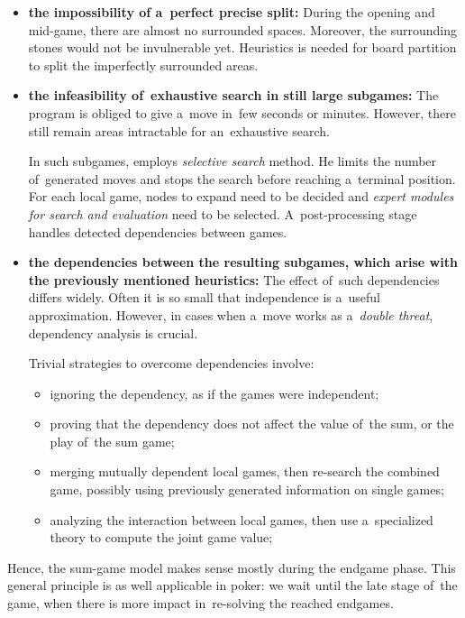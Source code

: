 \begin{itemize}[-]
  \item \textbf{the impossibility of a~perfect precise split:}
    During the opening and mid-game, there are almost no surrounded spaces.
    Moreover, the surrounding stones would not be invulnerable yet.
    Heuristics is needed for board partition to split the imperfectly surrounded areas.

  \item \textbf{the infeasibility of~exhaustive search in still large subgames:}
    The program is obliged to give a~move in~few seconds or minutes.
    However, there still remain areas intractable for an~exhaustive search.

    In such subgames, \Mueller{} employs \emph{selective search} method.
    He limits the number of~generated moves and stops the search before reaching a~terminal position.
    For each local game, nodes to expand need to be decided and \emph{expert modules for search and evaluation} need to be selected.
    A~post-processing stage handles detected dependencies between games.

  \item \textbf{the dependencies between the resulting subgames, which arise with the previously mentioned heuristics:}
    The effect of~such dependencies differs widely.
    Often it is so small that independence is a~useful approximation.
    However, in cases when a~move works as a~\emph{double threat}, dependency analysis is crucial.

    Trivial strategies to overcome dependencies involve:
    \begin{itemize}
      \item ignoring the dependency, as if the games were independent;
      \item proving that the dependency does not affect the value of~the sum, or the play of~the sum game;
      \item merging mutually dependent local games, then re-search the combined game, possibly using previously generated information on single games;
      \item analyzing the interaction between local games, then use a~specialized theory to compute the joint game value;
    \end{itemize}
\end{itemize}

Hence, the sum-game model makes sense mostly during the endgame phase.
This general principle is as well applicable in poker:
we wait until the late stage of~the game, when there is more impact in~re-solving the reached endgames.

